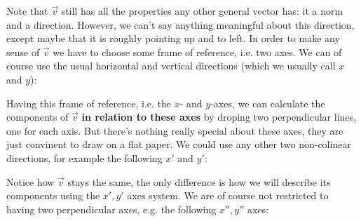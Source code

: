 Note that $\vec{v}$ still has all the properties any other general vector has: it a norm and a direction. However, we can't say anything meaningful about this direction, except maybe that it is roughly pointing up and to left. In order to make any sense of $\vec{v}$ we have to choose some frame of reference, i.e. two axes. We can of course use the usual horizontal and vertical directions (which we usually call $x$ and $y$):

\begin{center}
\end{center}

Having this frame of reference, i.e. the $x$- and $y$-axes, we can calculate the components of $\vec{v}$ \textbf{in relation to these axes} by droping two perpendicular lines, one for each axis. But there's nothing really special about these axes, they are just convinent to draw on a flat paper. We could use any other two non-colinear directions, for example the following $x'$ and $y'$:

\begin{center}
\end{center}

Notice how $\vec{v}$ stays the same, the only difference is how we will describe its components using the $x',y'$ axes system. We are of course not restricted to having two perpendicular axes, e.g. the following $x'',y''$ axes:

